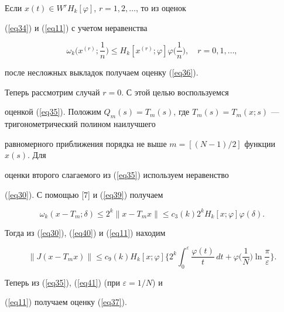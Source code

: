 \begin{pf}


Если $x(t)\in


W^rH_k[\varphi]$, $r=1,2,\dotsc$, то из оценок


(\ref{eq34}) и (\ref{eq11}) с учетом неравенства


\begin{equation}\label{eq39}


\omega_k\bigg(x^{(r)};\frac{1}{n}\bigg) \leq


H_k[x^{(r)};\varphi] \varphi\bigg(\frac{1}{n}\bigg),


\quad r=0,1,\dotsc,


\end{equation}


после несложных выкладок получаем оценку (\ref{eq36}).





Теперь рассмотрим случай $r=0$. С этой целью воспользуемся


оценкой (\ref{eq35}). Положим $Q_m(s) =


T_m(s)$, где $T_m(s) =


T_m(x;s)$ --- тригонометрический полином наилучшего


равномерного приближения порядка не выше $m =


[(N-1)/2]$ функции $x(s)$. Для


оценки второго слагаемого из (\ref{eq35}) используем неравенство


(\ref{eq30}). С помощью [7] и (\ref{eq39}) получаем


\begin{equation}\label{eq40}


\omega_k(x-T_m;\delta) \leq 2^k\|x-T_mx\|


\leq c_3(k)2^kH_k [x;\varphi]


\varphi(\delta).


\end{equation}


Тогда из (\ref{eq30}), (\ref{eq40}) и (\ref{eq11}) находим


\begin{equation}\label{eq41}


\|J(x-T_mx)\| \leq c_9(k)


H_k[x;\varphi] \bigg\{2^k\int_0^\varepsilon


\frac{\varphi(t)}{t}\,dt + \varphi \bigg(\frac{1}{N}\bigg)


\ln\frac{\pi}{\varepsilon}\bigg\}.


\end{equation}


Теперь из (\ref{eq35}), (\ref{eq41}) (при $\varepsilon=1/N$) и


(\ref{eq11}) получаем оценку (\ref{eq37}).


\end{pf}








